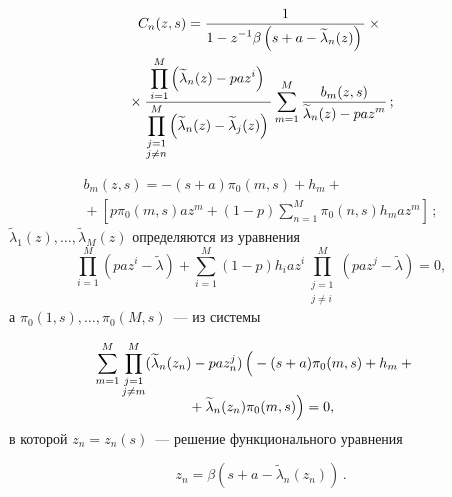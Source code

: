 \begin{multicols}{2}
\noindent
\begin{multline*}
C_n(z,s)=\displaystyle\frac{\displaystyle 1\mathstrut}{\displaystyle 1-z^{-1}\beta\left(s+a-\widetilde{\lambda}_n(z)\right)\mathstrut}\times{}\\
{}\times
\displaystyle\frac{\displaystyle \prod\limits_{i=1}^M\left(\widetilde{\lambda}_n(z)-paz^i\right)\mathstrut}{\displaystyle \prod\limits_{\substack{j=1\\j\neq n}}^M
\left(\widetilde{\lambda}_n(z)-\widetilde{\lambda}_j(z)\right)\mathstrut}
\sum\limits_{m=1}^M
\displaystyle\frac{\displaystyle b_m(z,s)\mathstrut}{\displaystyle \widetilde{\lambda}_n(z)-paz^m\mathstrut}\,;
\end{multline*}

\vspace*{-14pt}

\noindent
\begin{multline*}
b_m (z,s)=-(s+a)\pi_0(m,s)+h_m+{}\\
{}+\left[p\pi_0(m,s)az^m+(1-p)
\sum\limits_{n=1}^{M}\pi_0(n,s)h_m az^m\right]\,;
\end{multline*}
$\widetilde{\lambda}_1(z),\ldots,\widetilde{\lambda}_M(z)$ определяются из уравнения
\begin{equation*}
\prod\limits_{i=1}^M\left(paz^i-\widetilde{\lambda}\right)+
\sum_{i=1}^M(1-p)h_i az^i\prod_{\substack{j=1\\j\neq i}}^M(paz^j-\widetilde{\lambda})=0,
\end{equation*}
а $\pi_0(1,s),\ldots,\pi_0(M,s)$~--- из системы


\noindent
\begin{multline*}
\hspace*{-6.1518pt}\sum\limits_{m=1}^M\prod\limits_{\substack{j=1\\j\neq m}}^M(\widetilde{\lambda}_n(z_n)-
paz_n^j)\left(
\vphantom{\widetilde{\lambda}_n}
-(s+a)\pi_0(m,s)+h_m+{}\right.\\[-6pt]
\left.{}+\widetilde{\lambda}_n(z_n)\pi_0(m,s)\right)=0,
\end{multline*}
в которой $z_n=z_n(s)$~--- решение функционального уравнения

\vspace*{-2pt}

\noindent
$$
z_n=\beta(s+a-\widetilde{\lambda}_n(z_n))\,.
$$


\end{multicols}
